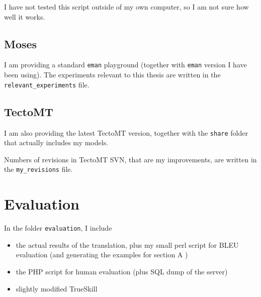 I have not tested this script outside of my own computer, so I am not sure how well it works.

\subsection{Moses}
I am providing a standard \texttt{eman} playground (together with \texttt{eman} version I have been using). The experiments relevant to this thesis are written in the \texttt{relevant\_experiments} file.

\subsection{TectoMT}
I am also providing the latest TectoMT version, together with the \texttt{share} folder that actually includes my models.

Numbers of revisions in TectoMT SVN, that are my improvements, are written in the \texttt{my\_revisions} file.


\section{Evaluation}
In the folder \texttt{evaluation}, I include
\begin{itemize}
\item the actual results of the translation, plus my small perl script for BLEU evaluation (and generating the examples for section A )
\item the PHP script for human evaluation (plus SQL dump of the server)
\item slightly modified TrueSkill
\end{itemize}


